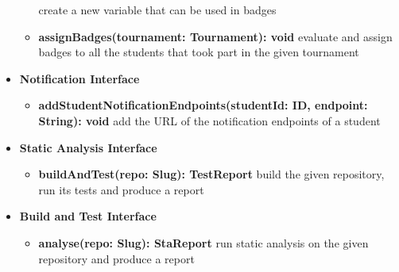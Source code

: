 \begin{itemize}
\begin{itemize}
                    create a new variable that can be used in badges
              \item \textbf{assignBadges(tournament: Tournament): void}
                    evaluate and assign badges to all the students that took part in the given tournament
          \end{itemize}
    \item \textbf{Notification Interface}
          \begin{itemize}
              \item \textbf{addStudentNotificationEndpoints(studentId: ID, endpoint: String): void}
                    add the URL of the notification endpoints of a student
          \end{itemize}
    \item \textbf{Static Analysis Interface}
          \begin{itemize}
              \item \textbf{buildAndTest(repo: Slug): TestReport}
                    build the given repository, run its tests and produce a report
          \end{itemize}
    \item \textbf{Build and Test Interface}
          \begin{itemize}
              \item \textbf{analyse(repo: Slug): StaReport}
                    run static analysis on the given repository and produce a report
          \end{itemize}
\end{itemize}

